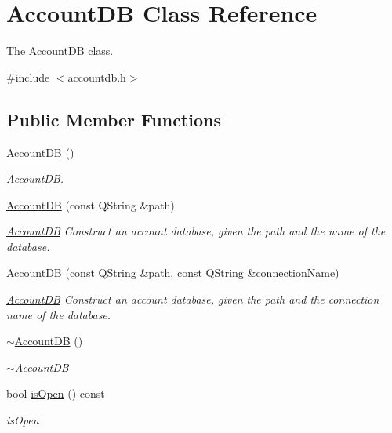\hypertarget{classAccountDB}{}\section{Account\+DB Class Reference}
\label{classAccountDB}


The \hyperlink{classAccountDB}{Account\+DB} class.  




{\ttfamily \#include $<$accountdb.\+h$>$}

\subsection*{Public Member Functions}
\begin{DoxyCompactItemize}
\item 
\hyperlink{classAccountDB_a935f760528c8292a089400e1f3ea9577}{Account\+DB} ()
\begin{DoxyCompactList}\small\item\em \hyperlink{classAccountDB}{Account\+DB}. \end{DoxyCompactList}\item 
\hyperlink{classAccountDB_a2ca09cf320edd35c90303d3a7ba91204}{Account\+DB} (const Q\+String \&path)
\begin{DoxyCompactList}\small\item\em \hyperlink{classAccountDB}{Account\+DB} Construct an account database, given the path and the name of the database. \end{DoxyCompactList}\item 
\hyperlink{classAccountDB_a551774b53bdaafb29cd22879de660d4e}{Account\+DB} (const Q\+String \&path, const Q\+String \&connection\+Name)
\begin{DoxyCompactList}\small\item\em \hyperlink{classAccountDB}{Account\+DB} Construct an account database, given the path and the connection name of the database. \end{DoxyCompactList}\item 
\hyperlink{classAccountDB_ac9980df714c334f2cb305ea070a6c4a3}{$\sim$\+Account\+DB} ()
\begin{DoxyCompactList}\small\item\em $\sim$\+Account\+DB \end{DoxyCompactList}\item 
bool \hyperlink{classAccountDB_a75ce23da6b5a397b07c5a527eaf27ec9}{is\+Open} () const 
\begin{DoxyCompactList}\small\item\em is\+Open \end{DoxyCompactList}\item 

\end{DoxyCompactItemize}
